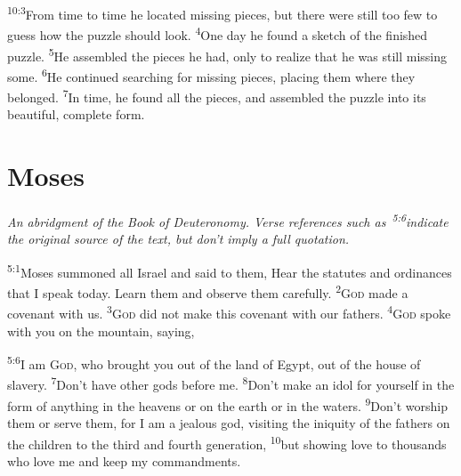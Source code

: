 \documentclass[openany,12pt,english]{book}
\newenvironment{para}{\par\pretolerance=100\tolerance=200\setlength{\emergencystretch}{0.6em}\relax}{\par}
\begin{document}
\begin{para}
    \textsuperscript{10:3}\thinspace{}From time to time he lo\-cat\-ed mis\-sing pieces, but there were still too few to guess how the puz\-zle should look.
    \textsuperscript{4}\thinspace{}One day he found a sketch of the fin\-ished puz\-zle.
    \textsuperscript{5}\thinspace{}He as\-sem\-bled the pieces he had, on\-ly to re\-al\-ize that he was still mis\-sing some.
    \textsuperscript{6}\thinspace{}He con\-tin\-ued search\-ing for mis\-sing pieces, plac\-ing them where they belonged.
    \textsuperscript{7}\thinspace{}In time, he found all the pieces, and as\-sem\-bled the puz\-zle in\-to its beau\-ti\-ful, com\-plete form.
\end{para}

\chapter*{Moses}
\begin{changemargin}{.6in}{.6in}
  \begin{center}
    \itshape
    An a\-bridg\-ment of the Book of Deuteronomy.
    Verse references such
    as~\textsuperscript{5:6}\thinspace{}indicate
    the original source of the text, but
    don't imply a full quotation.
  \end{center}
\end{changemargin}
\begin{para}
    \textsuperscript{5:1}\thinspace{}Mo\-ses summoned all Israel and said to them, Hear the statutes and ordinances that I speak to\-day. Learn them and ob\-serve them care\-ful\-ly.
    \textsuperscript{2}\thinspace{}\textsc{God} made a cov\-e\-nant with us.
    \textsuperscript{3}\thinspace{}\textsc{God} did not make this cov\-e\-nant with our fathers.
    \textsuperscript{4}\thinspace{}\textsc{God} spoke with you on the moun\-tain, say\-ing,
\end{para}

\begin{para}
    \textsuperscript{5:6}\thinspace{}I am \textsc{God}, who brought you out of the land of Egypt, out of the house of slav\-er\-y.
    \textsuperscript{7}\thinspace{}Don't have oth\-er gods be\-fore me.
    \textsuperscript{8}\thinspace{}Don't make an i\-dol for your\-self in the form of any\-thing in the heavens or on the earth or in the waters.
    \textsuperscript{9}\thinspace{}Don't wor\-ship them or serve them, for I am a jeal\-ous god, visiting the in\-iq\-ui\-ty of the fathers on the chil\-dren to the third and fourth gen\-er\-a\-tion,
    \textsuperscript{10}\thinspace{}but show\-ing love to thousands who love me and keep my commandments.
\end{para}
\end{document}
